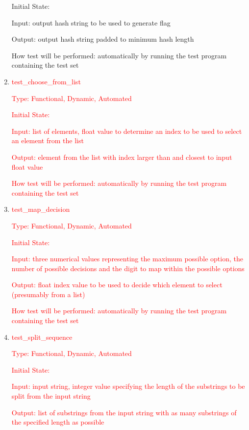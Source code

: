\documentclass[12pt, titlepage]{article}
\begin{document}
\begin{enumerate}
Initial State:

Input: output hash string to be used to generate flag

Output: output hash string padded to minimum hash length

How test will be performed: automatically by running the test program
containing the test set

\item{\textcolor{red}{test\_choose\_from\_list\\}}

\textcolor{red}{Type: Functional, Dynamic, Automated}

\textcolor{red}{Initial State:}

\textcolor{red}{Input: list of elements, float value to determine an index to
be used to select an element from the list}

\textcolor{red}{Output: element from the list with index larger than and
closest to input float value}

\textcolor{red}{How test will be performed: automatically by running the test
program containing the test set}

\item{\textcolor{red}{test\_map\_decision\\}}

\textcolor{red}{Type: Functional, Dynamic, Automated}

\textcolor{red}{Initial State:}

\textcolor{red}{Input: three numerical values representing the maximum
possible option, the number of possible decisions and the digit to map within
the possible options}

\textcolor{red}{Output: float index value to be used to decide which element
to select (presumably from a list)}

\textcolor{red}{How test will be performed: automatically by running the test
program containing the test set}

\item{\textcolor{red}{test\_split\_sequence\\}}

\textcolor{red}{Type: Functional, Dynamic, Automated}

\textcolor{red}{Initial State:}

\textcolor{red}{Input: input string, integer value specifying the length of
the substrings to be split from the input string}

\textcolor{red}{Output: list of substrings from the input string with as many
substrings of the specified length as possible}


\end{enumerate}
\end{document}
